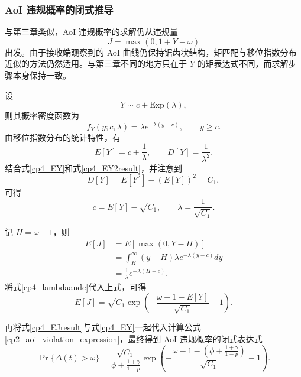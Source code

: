 \subsubsection{AoI 违规概率的闭式推导}

与第三章类似，AoI 违规概率的求解仍从违规量
\[
J=\max(0,1+Y-\omega)
\]
出发。由于接收端观察到的 AoI 曲线仍保持锯齿状结构，矩匹配与移位指数分布近似的方法仍然适用。与第三章不同的地方只在于 $Y$ 的矩表达式不同，而求解步骤本身保持一致。

设
\[
Y\sim c+\mathrm{Exp}(\lambda),
\]
则其概率密度函数为
\begin{equation}
    f_Y(y;c,\lambda)=\lambda e^{-\lambda(y-c)},\qquad y\ge c.
\end{equation}
由移位指数分布的统计特性，有
\begin{equation}
    E[Y] = c + \frac{1}{\lambda},\qquad D[Y] = \frac{1}{\lambda^2}.
\end{equation}
结合式\eqref{cp4_EY}和式\eqref{cp4_EY2result}，并注意到
\[
D[Y] = E[Y^2] - (E[Y])^2 = C_1,
\]
可得
\begin{equation}\label{cp4_lambdaandc}
    c = E[Y]-\sqrt{C_1},\qquad \lambda=\frac{1}{\sqrt{C_1}}.
\end{equation}

记 $H=\omega-1$，则
\begin{equation}
    \begin{aligned}
        E[J] &= E[\max(0,Y-H)] \\
             &= \int_H^\infty (y-H)\lambda e^{-\lambda(y-c)}dy \\
             &= \frac{1}{\lambda}e^{-\lambda(H-c)}.
    \end{aligned}
\end{equation}
将式\eqref{cp4_lambdaandc}代入上式，可得
\begin{equation}\label{cp4_EJresult}
    E[J] = \sqrt{C_1}\exp\left(-\frac{\omega-1-E[Y]}{\sqrt{C_1}}-1\right).
\end{equation}

再将式\eqref{cp4_EJresult}与式\eqref{cp4_EY}一起代入计算公式\eqref{cp2_aoi_violation_expression}，最终得到 AoI 违规概率的闭式表达式
\begin{equation}\label{cp4_violation_prob_simplified}
    \Pr\{\Delta(t)>\omega\}=
    \frac{\sqrt{C_1}}{\phi + \frac{1+\gamma}{1-p}}
    \exp\left(
    -\frac{\omega-1-\left(\phi + \frac{1+\gamma}{1-p}\right)}{\sqrt{C_1}}
    -1
    \right).
\end{equation}

